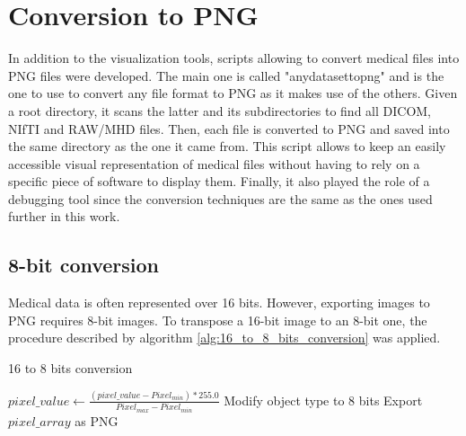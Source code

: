 \section{Conversion to PNG}
\setlength{\marginparwidth}{3cm}\leavevmode {}In addition to the visualization tools, scripts allowing to convert medical files into PNG files were developed. The main one is called "anydatasettopng" and is the one to use to convert any file format to PNG as it makes use of the others. Given a root directory, it scans the latter and its subdirectories to find all DICOM, NIfTI and RAW/MHD files. Then, each file is converted to PNG and saved into the same directory as the one it came from. This script allows to keep an easily accessible visual representation of medical files without having to rely on a specific piece of software to display them. Finally, it also played the role of a debugging tool since the conversion techniques are the same as the ones used further in this work. 


\subsection{8-bit conversion}
\setlength{\marginparwidth}{3cm}\leavevmode {}Medical data is often represented over 16 bits. However, exporting images to PNG requires 8-bit images. To transpose a 16-bit image to an 8-bit one, the procedure described by algorithm \ref{alg:16_to_8_bits_conversion} was applied. 

\begin{algorithm}
    \caption{16 to 8 bits conversion}
    \label{alg:16_to_8_bits_conversion}
    \begin{algorithmic}[1] %
        			\State $pixel\_value \gets \frac{(pixel\_value - Pixel_{min}) * 255.0}{Pixel_{max} - Pixel_{min}}$
        		\EndFor
        		\State Modify object type to 8 bits
        		\State Export $pixel\_array$ as PNG
        \EndProcedure
    \end{algorithmic}
\end{algorithm}